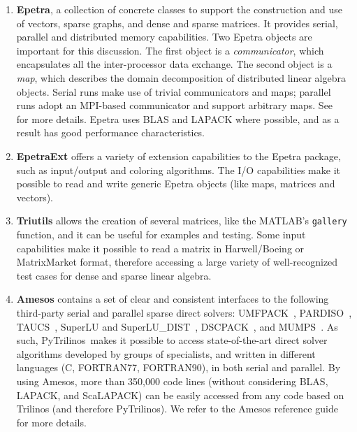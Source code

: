 \documentclass[10pt,relax]{SANDreport}
\newcommand{\PyTrilinos}{{PyTrilinos}}
\begin{document}
\begin{enumerate}

\item {\bf Epetra}, a collection of concrete classes to support the
  construction and use of vectors, sparse graphs, and dense and sparse
  matrices. It provides serial, parallel and distributed memory
  capabilities. Two Epetra objects are important for this
  discussion. The first object is a {\sl communicator}, which
  encapsulates all the inter-processor data exchange. The second
  object is a {\sl map}, which describes the domain decomposition of
  distributed linear algebra objects. Serial runs make use of trivial
  communicators and maps; parallel runs adopt an MPI-based
  communicator and support arbitrary maps. See~\cite{epetra-guide} for
  more details.  Epetra uses BLAS and LAPACK where possible, and as a
  result has good performance characteristics.

\item {\bf EpetraExt} offers a variety of extension capabilities to
  the Epetra package, such as input/output and coloring algorithms.
  The I/O capabilities make it possible to read and write generic
  Epetra objects (like maps, matrices and vectors).

\item {\bf Triutils} allows the creation of several matrices, like the
  MATLAB's {\tt gallery} function, and it can be useful for examples
  and testing. Some input capabilities make it possible to read a matrix in
  Harwell/Boeing or MatrixMarket format, therefore accessing a large variety
  of well-recognized test cases for dense and sparse linear algebra.

\item {\bf Amesos} contains a set of clear and consistent interfaces
  to the following third-party serial and parallel sparse direct
  solvers: UMFPACK~\cite{umfpack-manual},
  PARDISO~\cite{pardiso-manual}, TAUCS~\cite{taucs-manual}, SuperLU
  and SuperLU\_DIST~\cite{superlu-manual},
  DSCPACK~\cite{dscpack-manual}, and MUMPS~\cite{mumps-manual}. As
  such, \PyTrilinos\ makes it possible to access state-of-the-art
  direct solver algorithms developed by groups of specialists, and
  written in different languages (C, FORTRAN77, FORTRAN90), in both
  serial and parallel. By using Amesos, more than 350,000 code lines (without
  considering BLAS, LAPACK, and ScaLAPACK) can be easily accessed from any
  code based on Trilinos (and therefore PyTrilinos).  We refer to the Amesos
  reference guide~\cite{Amesos-Reference-Guide} for more details.


\end{enumerate}
\end{document}
